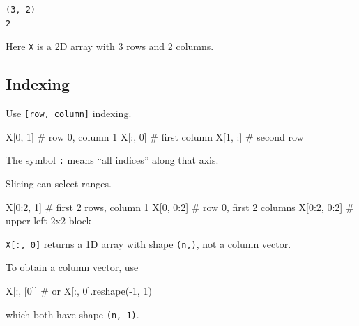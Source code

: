\documentclass[
  letterpaper,
  DIV=11,
  numbers=noendperiod]{scrreprt}
\newenvironment{Shaded}{\begin{snugshade}}{\end{snugshade}}
\newcommand{\CommentTok}[1]{\textcolor[rgb]{0.37,0.37,0.37}{#1}}
\newcommand{\DecValTok}[1]{\textcolor[rgb]{0.68,0.00,0.00}{#1}}
\newcommand{\NormalTok}[1]{\textcolor[rgb]{0.00,0.23,0.31}{#1}}
\newcommand{\OperatorTok}[1]{\textcolor[rgb]{0.37,0.37,0.37}{#1}}
\theoremstyle{definition}
\theoremstyle{definition}
\theoremstyle{plain}
\theoremstyle{plain}
\theoremstyle{remark}
\begin{document}
\begin{verbatim}
(3, 2)
2
\end{verbatim}

Here \texttt{X} is a 2D array with 3 rows and 2 columns.

\subsection{Indexing}\label{indexing}

Use \texttt{{[}row,\ column{]}} indexing.

\begin{Shaded}
\begin{Highlighting}[]
\NormalTok{X[}\DecValTok{0}\NormalTok{, }\DecValTok{1}\NormalTok{]      }\CommentTok{\# row 0, column 1}
\NormalTok{X[:, }\DecValTok{0}\NormalTok{]      }\CommentTok{\# first column}
\NormalTok{X[}\DecValTok{1}\NormalTok{, :]      }\CommentTok{\# second row}
\end{Highlighting}
\end{Shaded}

The symbol \texttt{:} means ``all indices'' along that axis.

Slicing can select ranges.

\begin{Shaded}
\begin{Highlighting}[]
\NormalTok{X[}\DecValTok{0}\NormalTok{:}\DecValTok{2}\NormalTok{, }\DecValTok{1}\NormalTok{]      }\CommentTok{\# first 2 rows, column 1}
\NormalTok{X[}\DecValTok{0}\NormalTok{, }\DecValTok{0}\NormalTok{:}\DecValTok{2}\NormalTok{]      }\CommentTok{\# row 0, first 2 columns}
\NormalTok{X[}\DecValTok{0}\NormalTok{:}\DecValTok{2}\NormalTok{, }\DecValTok{0}\NormalTok{:}\DecValTok{2}\NormalTok{]    }\CommentTok{\# upper{-}left 2x2 block}
\end{Highlighting}
\end{Shaded}

\begin{tcolorbox}[enhanced jigsaw, arc=.35mm, bottomrule=.15mm, bottomtitle=1mm, breakable, colback=white, colbacktitle=quarto-callout-note-color!10!white, colframe=quarto-callout-note-color-frame, coltitle=black, left=2mm, leftrule=.75mm, opacityback=0, opacitybacktitle=0.6, rightrule=.15mm, title=\textcolor{quarto-callout-note-color}{\faInfo}\hspace{0.5em}{Note}, titlerule=0mm, toprule=.15mm, toptitle=1mm]

\texttt{X{[}:,\ 0{]}} returns a 1D array with shape \texttt{(n,)}, not a
column vector.

To obtain a column vector, use

\begin{Shaded}
\begin{Highlighting}[]
\NormalTok{X[:, [}\DecValTok{0}\NormalTok{]]}
\CommentTok{\# or}
\NormalTok{X[:, }\DecValTok{0}\NormalTok{].reshape(}\OperatorTok{{-}}\DecValTok{1}\NormalTok{, }\DecValTok{1}\NormalTok{)}
\end{Highlighting}
\end{Shaded}

which both have shape \texttt{(n,\ 1)}.

\end{tcolorbox}
\end{document}
